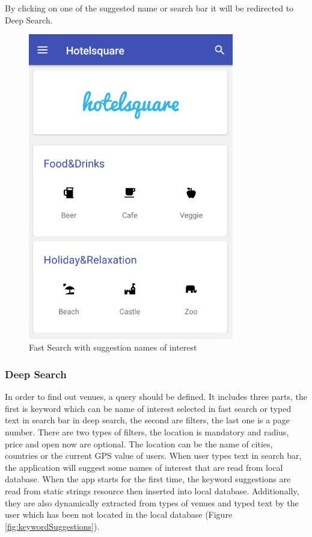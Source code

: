  By clicking on one of the suggested name or search bar it will be redirected to Deep Search.
\begin{figure}[htbp]
	\includegraphics[width=0.8\textwidth]{images/fastsearch.png}
	\centering
	\caption[]{Fast Search with suggestion names of interest}
	\label{fig:fastsearch}
\end{figure} 
\subsubsection{Deep Search}

In order to find out venues, a query should be defined. It includes three parts, the first is keyword which can be name of interest selected in fast search or typed text in search bar in deep search, the second are filters, the last one is a page number. There are two types of filters, the location is mandatory and  radius, price and open now  are optional. The location can be the name of cities, countries or the current GPS value of users.
When user types text in search bar, the application will suggest some names of interest that are 
read from local database. When the app starts for the first time, the keyword suggestions  are read from static strings resource then inserted into local database. Additionally, they are also dynamically extracted from types of venues and typed text by the user which has been not located in the local database (Figure \ref{fig:keywordSuggestions}).

